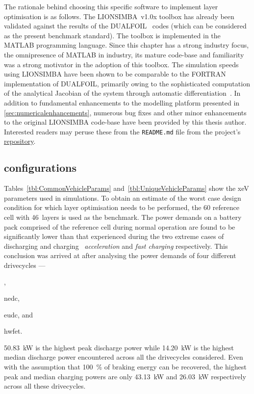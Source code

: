 The  rationale  behind  choosing  this  specific  software  to  implement  layer
optimisation  is  as  follows.  The LIONSIMBA~v1.0x  toolbox  has  already  been
validated against  the results of the  DUALFOIL~\cite{Dualfoil1998} codes (which
can be considered as the present benchmark standard). The toolbox is implemented
in the  MATLAB programming language.  Since this  chapter has a  strong industry
focus,  the  omnipresence  of  MATLAB  in industry,  its  mature  code-base  and
familiarity  was  a strong  motivator  in  the  adoption  of this  toolbox.  The
simulation  speeds using  LIONSIMBA  have been  shown to  be  comparable to  the
FORTRAN  implementation  of  DUALFOIL,  primarily  owing  to  the  sophisticated
computation  of  the  analytical  Jacobian   of  the  system  through  automatic
differentiation~\cite{Torchio2016}.  In  addition  to  fundamental  enhancements
to  the   modelling  platform  presented   in  \cref{sec:numericalenhancements},
numerous  bug fixes  and  other  minor enhancements  to  the original  LIONSIMBA
code-base  have  been  provided  by   this  thesis  author.  Interested  readers
may  peruse   these  from  the   \texttt{README.md}  file  from   the  project's
\href{https://github.com/lionsimbatoolbox/LIONSIMBA}{repository}.

\subsection{ configurations}



Tables~\ref{tbl:CommonVehicleParams} and~\ref{tbl:UniqueVehicleParams}  show the
\gls{xeV}  parameters used  in simulations.  To obtain an estimate of the worst
case design condition for which layer optimisation needs to be performed, the
\SI{60}{\amphour} reference cell with 46~layers is used as the benchmark. The
power demands  on a  battery
pack  comprised of the reference cell during  normal  operation  are   found  to
be  significantly  lower  than that  experienced during  the  two  extreme cases
of  discharging and  charging \viz~\emph{acceleration} and \emph{fast  charging}
respectively. This conclusion was arrived at after analysing the power demands
of four different drivecycles
--- 
\begin{enumerate*}[label=\itshape\alph*\upshape)]
    \item {},
    \item \gls{nedc},
    \item \gls{eudc}, and
    \item \gls{hwfet}.
\end{enumerate*}
\SI{50.83}{\kilo\watt} is the highest peak  discharge power while
\SI{14.20}{\kilo\watt} is  the highest median  discharge power encountered
across all the drivecycles considered. Even  with the  assumption that 
\SI{100}{\percent}  of braking  energy  can be  recovered, the  highest peak 
and  median  charging  powers  are  only  \SI{43.13}{\kilo\watt}  and
\SI{26.03}{\kilo\watt}  respectively across all these drivecycles.

